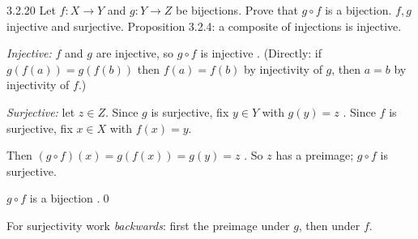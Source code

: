\begin{bookex}[essential]{3.2.20}
Let $f:X\to Y$ and $g:Y\to Z$ be bijections. Prove that $g\circ f$ is a bijection.
\solution
\given $f,g$ injective and surjective. Proposition 3.2.4: a composite of injections is injective.
\begin{steps}
\item \emph{Injective:} $f$ and $g$ are injective, so $g\circ f$ is injective . (Directly: if $g(f(a))=g(f(b))$ then $f(a)=f(b)$ by injectivity of $g$, then $a=b$ by injectivity of $f$.)
\item \emph{Surjective:} let $z\in Z$. Since $g$ is surjective, fix $y\in Y$ with $g(y)=z$ . Since $f$ is surjective, fix $x\in X$ with $f(x)=y$.
\item Then $(g\circ f)(x)=g(f(x))=g(y)=z$ . So $z$ has a preimage; $g\circ f$ is surjective.
\end{steps}
\conclusion $g\circ f$ is a bijection .\qed
\begin{compare}
\item For surjectivity work \emph{backwards}: first the preimage under $g$, then under $f$.
\end{compare}
\end{bookex}

